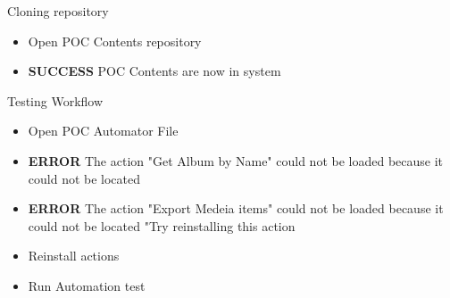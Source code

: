 \documentclass{article}
\begin{document}
Cloning repository
\begin{itemize}
\item Open POC Contents repository
\item \textbf{SUCCESS} POC Contents are now in system
\end{itemize}

Testing Workflow
\begin{itemize}
\item Open POC Automator File
\item \textbf{ERROR} The action "Get Album by Name" could not be loaded because it could not be located
\item \textbf{ERROR} The action "Export Medeia items" could not be loaded because it could not be located "Try reinstalling this action
\item Reinstall actions
\item Run Automation test
\end{itemize}
\end{document}
